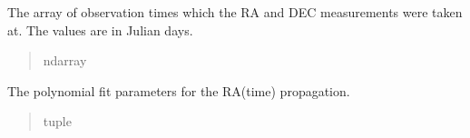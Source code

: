 \documentclass[letterpaper,11pt,english]{sphinxmanual}
\begin{document}
\begin{savenotes}
\begin{fulllineitems}
\begin{savenotes}
\begin{fulllineitems}
\begin{quote}
\begin{description}
\end{description}\end{quote}

\end{fulllineitems}\end{savenotes}


\begin{savenotes}\begin{fulllineitems}
\label{\detokenize{code/opihiexarata.propagate.polynomial:opihiexarata.propagate.polynomial.QuadraticPropagationEngine.obs_time_array}}
\pysigstartsignatures
{}
\pysigstopsignatures
\sphinxAtStartPar
The array of observation times which the RA and DEC measurements were
taken at. The values are in Julian days.
\begin{quote}\begin{description}
\sphinxAtStartPar
ndarray

\end{description}\end{quote}

\end{fulllineitems}\end{savenotes}


\begin{savenotes}\begin{fulllineitems}
\label{\detokenize{code/opihiexarata.propagate.polynomial:opihiexarata.propagate.polynomial.QuadraticPropagationEngine.ra_poly_param}}
\pysigstartsignatures
{}
\pysigstopsignatures
\sphinxAtStartPar
The polynomial fit parameters for the RA(time) propagation.
\begin{quote}\begin{description}
\sphinxAtStartPar
tuple

\end{description}\end{quote}


\end{fulllineitems}
\end{savenotes}
\end{fulllineitems}
\end{savenotes}
\end{document}
